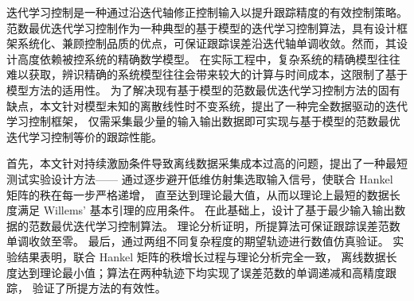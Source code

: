 
\begin{cabstract}
迭代学习控制是一种通过沿迭代轴修正控制输入以提升跟踪精度的有效控制策略。
范数最优迭代学习控制作为一种典型的基于模型的迭代学习控制算法，具有设计框架系统化、兼顾控制品质的优点，可保证跟踪误差沿迭代轴单调收敛。然而，其设计高度依赖被控系统的精确数学模型。
在实际工程中，复杂系统的精确模型往往难以获取，辨识精确的系统模型往往会带来较大的计算与时间成本，这限制了基于模型方法的适用性。
为了解决现有基于模型的范数最优迭代学习控制方法的固有缺点，本文针对模型未知的离散线性时不变系统，提出了一种完全数据驱动的迭代学习控制框架，
仅需采集最少量的输入输出数据即可实现与基于模型的范数最优迭代学习控制等价的跟踪性能。

首先，本文针对持续激励条件导致离线数据采集成本过高的问题，提出了一种最短测试实验设计方法——
通过逐步避开低维仿射集选取输入信号，使联合 Hankel 矩阵的秩在每一步严格递增，
直至达到理论最大值，从而以理论上最短的数据长度满足 Willems' 基本引理的应用条件。
在此基础上，设计了基于最少输入输出数据的范数最优迭代学习控制算法。
理论分析证明，所提算法可保证跟踪误差范数单调收敛至零。
最后，通过两组不同复杂程度的期望轨迹进行数值仿真验证。
实验结果表明，联合 Hankel 矩阵的秩增长过程与理论分析完全一致，
离线数据长度达到理论最小值；算法在两种轨迹下均实现了误差范数的单调递减和高精度跟踪，
验证了所提方法的有效性。
\end{cabstract}

